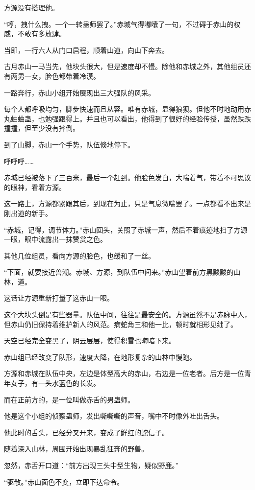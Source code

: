 \begin{this_body}
方源没有搭理他。

“哼，拽什么拽。一个一转蛊师罢了。”赤城气得嘟囔了一句，不过碍于赤山的权威，不敢有多放肆。

当即，一行六人从门口启程，顺着山道，向山下奔去。

古月赤山一马当先，他块头很大，但是速度却不慢。除他和赤城之外，其他组员还有两男一女，脸色都带着冷漠。

一路奔行，赤山小组开始展现出三大强队的风采。

每个人都呼吸均匀，脚步快速而且从容。唯有赤城，显得狼狈。但他不时地动用赤丸蛐蛐蛊，也勉强跟得上。并且也可以看出，他得到了很好的经验传授，虽然跌跌撞撞，但至少没有摔倒。

到了山脚，赤山一个手势，队伍倏地停下。

呼呼呼……

赤城已经被落下了三百米，最后一个赶到。他脸色发白，大喘着气，带着不可思议的眼神，看着方源。

这一路上，方源都紧跟其后，到现在为止，只是气息微喘罢了。一点都看不出来是刚出道的新手。

“赤城，记得，调节体力。”赤山回头，关照了赤城一声，然后不着痕迹地扫了方源一眼，眼中流露出一抹赞赏之色。

其他几位组员，看向方源的脸色，也缓和了一丝。

“下面，就要接近兽潮。赤城、方源，到队伍中间来。”赤山望着前方黑黢黢的山林，道。

这话让方源重新打量了这赤山一眼。

这个大块头倒是有些器量。队伍中间，往往是最安全的。方源虽然不是赤脉中人，但赤山仍旧保持着维护新人的风范。病蛇角三和他一比，顿时就相形见绌了。

天空已经完全变黑了，阴云层层，使得积雪也晦暗下来。

赤山组已经改变了队形，速度大降，在地形复杂的山林中慢跑。

方源和赤城在队伍中央，左边是体型高大的赤山，右边是一位老者。后方是一位青年女子，有一头水蓝色的长发。

而在正前方的，是一位叫做赤舌的男蛊师。

他是这个小组的侦察蛊师，发出嘶嘶嘶的声音，嘴中不时像外吐出舌头。

他此时的舌头，已经分叉开来，变成了鲜红的蛇信子。

随着深入山林，周围开始出现暴乱狂奔的野兽。

忽然，赤舌开口道：“前方出现三头中型生物，疑似野鹿。”

“驱散。”赤山面色不变，立即下达命令。


\end{this_body}
